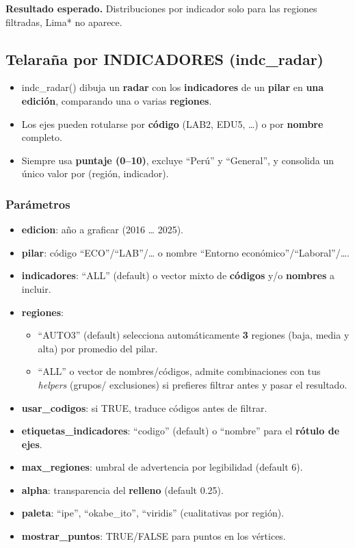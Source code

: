 \documentclass[
  11pt,
  letterpaper,
  DIV=11,
  numbers=noendperiod]{scrartcl}
\begin{document}
\textbf{Resultado esperado.} Distribuciones por indicador solo para las
regiones filtradas, Lima* no aparece.

\subsection{\texorpdfstring{\textbf{Telaraña por INDICADORES
(indc\_radar)}}{Telaraña por INDICADORES (indc\_radar)}}\label{telarauxf1a-por-indicadores-indc_radar}

\begin{itemize}
\item
  indc\_radar() dibuja un \textbf{radar} con los \textbf{indicadores} de
  un \textbf{pilar} en \textbf{una edición}, comparando una o varias
  \textbf{regiones}.
\item
  Los ejes pueden rotularse por \textbf{código} (LAB2, EDU5, \ldots) o
  por \textbf{nombre} completo.
\item
  Siempre usa \textbf{puntaje (0--10)}, excluye ``Perú'' y ``General'',
  y consolida un único valor por (región, indicador).
\end{itemize}

\subsubsection{\texorpdfstring{\textbf{Parámetros}}{Parámetros}}\label{paruxe1metros-10}

\begin{itemize}
\item
  \textbf{edicion}: año a graficar (2016 \ldots{} 2025).
\item
  \textbf{pilar}: código ``ECO''/``LAB''/\ldots{} o nombre ``Entorno
  económico''/``Laboral''/\ldots.
\item
  \textbf{indicadores}: ``ALL'' (default) o vector mixto de
  \textbf{códigos} y/o \textbf{nombres} a incluir.
\item
  \textbf{regiones}:

  \begin{itemize}
  \item
    ``AUTO3'' (default) selecciona automáticamente \textbf{3} regiones
    (baja, media y alta) por promedio del pilar.
  \item
    ``ALL'' o vector de nombres/códigos, admite combinaciones con tus
    \emph{helpers} (grupos/ exclusiones) si prefieres filtrar antes y
    pasar el resultado.
  \end{itemize}
\item
  \textbf{usar\_codigos}: si TRUE, traduce códigos antes de filtrar.
\item
  \textbf{etiquetas\_indicadores}: ``codigo'' (default) o ``nombre''
  para el \textbf{rótulo de ejes}.
\item
  \textbf{max\_regiones}: umbral de advertencia por legibilidad (default
  6).
\item
  \textbf{alpha}: transparencia del \textbf{relleno} (default 0.25).
\item
  \textbf{paleta}: ``ipe'', ``okabe\_ito'', ``viridis'' (cualitativas
  por región).
\item
  \textbf{mostrar\_puntos}: TRUE/FALSE para puntos en los vértices.
\end{itemize}
\end{document}
